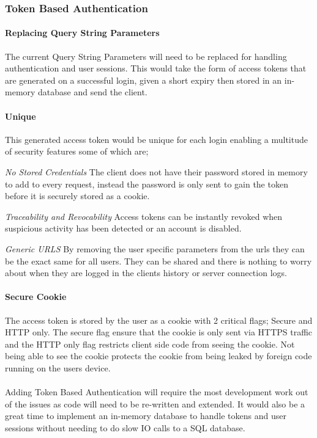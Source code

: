 \subsubsection{Token Based Authentication}
\paragraph{Replacing Query String Parameters}
The current Query String Parameters will need to be replaced for handling authentication and user sessions. 
This would take the form of access tokens that are generated on a successful login, given a short expiry then stored in an in-memory database and
send the client.

\paragraph{Unique}
This generated access token would be unique for each login enabling a multitude of security features some of which are;
\begin{description}

    \item \emph{No Stored Credentials} The client does not have their password stored in memory to add to every request,
    instead the password is only sent to gain the token before it is securely stored as a cookie.
    \item \emph{Traceability and Revocability} Access tokens can be instantly revoked when suspicious activity has been detected or an account is disabled.
    \item \emph{Generic URLS} By removing the user specific parameters from the urls they can be the exact same for all users.
    They can be shared and there is nothing to worry about when they are logged in the clients history or server connection logs.

\end{description}

\paragraph{Secure Cookie}
The access token is stored by the user as a cookie with 2 critical flags; Secure and HTTP only.
The secure flag ensure that the cookie is only sent via HTTPS traffic and the HTTP only flag restricts client side code from seeing the cookie.
Not being able to see the cookie protects the cookie from being leaked by foreign code running on the users device.

\paragraph{}
Adding Token Based Authentication will require the most development work out of the issues as code will need to be re-written and extended.
It would also be a great time to implement an in-memory database to handle tokens and user sessions without needing to do slow IO calls to a 
SQL database.

